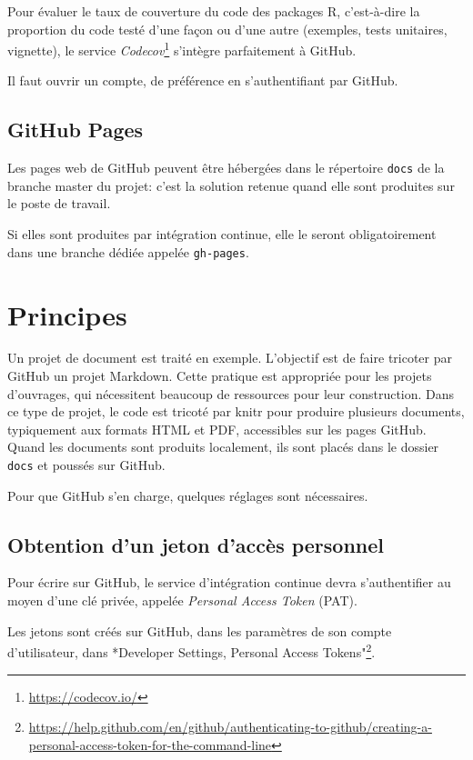 \documentclass[
  11pt,
  french,
  a4paper,
  extrafontsizes,onecolumn,openright
  ]{memoir}
\begin{document}
Pour évaluer le taux de couverture du code des packages R, c'est-à-dire la proportion du code testé d'une façon ou d'une autre (exemples, tests unitaires, vignette), le service \emph{Codecov}\footnote{\url{https://codecov.io/}} s'intègre parfaitement à GitHub.

Il faut ouvrir un compte, de préférence en s'authentifiant par GitHub.

\hypertarget{github-pages}{%
\subsection{GitHub Pages}\label{github-pages}}

Les pages web de GitHub peuvent être hébergées dans le répertoire \texttt{docs} de la branche master du projet: c'est la solution retenue quand elle sont produites sur le poste de travail.

Si elles sont produites par intégration continue, elle le seront obligatoirement dans une branche dédiée appelée \texttt{gh-pages}.

\hypertarget{principes}{%
\section{Principes}\label{principes}}

Un projet de document est traité en exemple.
L'objectif est de faire tricoter par GitHub un projet Markdown.
Cette pratique est appropriée pour les projets d'ouvrages, qui nécessitent beaucoup de ressources pour leur construction.
Dans ce type de projet, le code est tricoté par knitr pour produire plusieurs documents, typiquement aux formats HTML et PDF, accessibles sur les pages GitHub.
Quand les documents sont produits localement, ils sont placés dans le dossier \texttt{docs} et poussés sur GitHub.

Pour que GitHub s'en charge, quelques réglages sont nécessaires.

\hypertarget{sec:pat}{%
\subsection{Obtention d'un jeton d'accès personnel}\label{sec:pat}}

Pour écrire sur GitHub, le service d'intégration continue devra s'authentifier au moyen d'une clé privée, appelée \emph{Personal Access Token} (PAT).

Les jetons sont créés sur GitHub, dans les paramètres de son compte d'utilisateur, dans *Developer Settings, Personal Access Tokens"\footnote{\url{https://help.github.com/en/github/authenticating-to-github/creating-a-personal-access-token-for-the-command-line}}.
\end{document}

